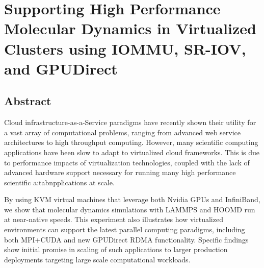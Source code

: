


\chapter{Supporting High Performance Molecular Dynamics in Virtualized Clusters using IOMMU, SR-IOV, and GPUDirect}
\label{chap:mdsimulations}

\section{Abstract}
Cloud infrastructure-as-a-Service paradigms have recently shown their utility for a vast array of computational problems, ranging from advanced web service architectures to high throughput computing.  However, many scientific computing applications have been slow to adapt to virtualized cloud frameworks. This is due to performance impacts of virtualization technologies, coupled with the lack of advanced hardware support necessary for running many high performance scientific a:tabnpplications at scale. 

By using KVM virtual machines that leverage both Nvidia GPUs and InfiniBand, we show that molecular dynamics simulations with LAMMPS and HOOMD run at near-native speeds. This experiment also illustrates how virtualized environments can support the latest parallel computing paradigms, including both MPI+CUDA and new GPUDirect RDMA functionality. Specific findings show initial promise in scaling of such applications to larger production deployments targeting large scale computational workloads.  


 


